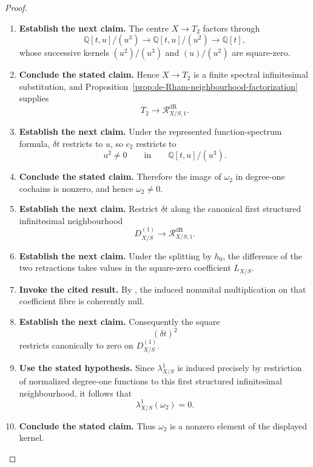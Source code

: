 \begin{proof}
\begin{enumerate}[label=\textup{(\arabic*)}]
\[    \]
    \item \textbf{Establish the next claim.}
    The centre \(X\to T_2\) factors through
    \[
    \mathbb Q[t,u]/(u^3)
    \longrightarrow
    \mathbb Q[t,u]/(u^2)
    \longrightarrow
    \mathbb Q[t],
    \]
    whose successive kernels \((u^2)/(u^3)\) and \((u)/(u^2)\) are square-zero.
    \item \textbf{Conclude the stated claim.}
    Hence \(X\to T_2\) is a finite spectral infinitesimal substitution, and
    Proposition~\ref{prop:de-Rham-neighbourhood-factorization} supplies
    \[
    T_2\longrightarrow
    \mathcal R^{\mathrm{dR}}_{X/S,1}.
    \]
    \item \textbf{Establish the next claim.}
    Under the represented function-spectrum formula,
    \(\delta t\) restricts to \(u\), so \(c_2\) restricts to
    \[
    u^2\neq0
    \qquad\text{in}\qquad
    \mathbb Q[t,u]/(u^3).
    \]
    \item \textbf{Conclude the stated claim.}
    Therefore the image of \(\omega_2\) in degree-one cochains is nonzero, and
    hence \(\omega_2\neq0\).
    \item \textbf{Establish the next claim.}
    Restrict \(\delta t\) along the canonical first structured infinitesimal neighbourhood
    \[
    D^{(1)}_{X/S}
    \longrightarrow
    \mathcal R^{\mathrm{dR}}_{X/S,1}.
    \]
    \item \textbf{Establish the next claim.}
    Under the splitting by \(h_0\), the difference of the two retractions takes
    values in the square-zero coefficient
    \(L_{X/S}\).
    \item \textbf{Invoke the cited result.}
    By
    , the induced nonunital multiplication
    on that coefficient fibre is coherently null.
    \item \textbf{Establish the next claim.}
    Consequently the square
    \[
    (\delta t)^2
    \]
    restricts canonically to zero on \(D^{(1)}_{X/S}\).
    \item \textbf{Use the stated hypothesis.}
    Since
    \(\lambda^1_{X/S}\) is induced precisely by restriction of normalized
    degree-one functions to this first structured infinitesimal neighbourhood, it follows that
    \[
    \lambda^1_{X/S}(\omega_2)=0.
    \]
    \item \textbf{Conclude the stated claim.}
    Thus \(\omega_2\) is a nonzero element of the displayed kernel.
\end{enumerate}
\end{proof}


